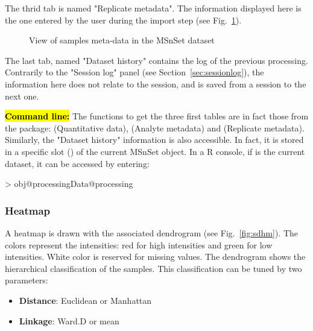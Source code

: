 \documentclass[12pt]{article}
\begin{document}
The thrid tab is named "Replicate metadata". The information displayed here is the one entered by the user during the import step (see Fig.~\ref{fig:sdqv3}).

\begin {figure}
\centering
{}
\caption{View of samples meta-data in the MSnSet dataset}\label{fig:sdqv3}
\end {figure}

The last tab, named "Dataset history" contains the log of the previous processing. Contrarily to the "Session log" panel (see Section~\ref{sec:sessionlog}), the information here does not relate to the session, and is saved from a session to the next one.

\hl{\bf Command line:}  The  functions to get the three first tables are in fact those from the  package:  (Quantitative data),  (Analyte metadata) and  (Replicate metadata). %
Similarly, the "Dataset history" information is also accessible. In fact, it is stored in a specific slot () of the current MSnSet object. In a R console, if  is the current dataset, it can be accessed by entering:
\begin{Schunk}
\begin{Sinput}
> obj@processingData@processing
\end{Sinput}
\end{Schunk}

\subsubsection {Heatmap}
A heatmap is drawn with the associated dendrogram (see Fig.~\ref{fig:sdhm}). The colors represent the intensities: red for high intensities and green for low intensities. White color is reserved for missing values.
The dendrogram shows the hierarchical classification of the samples. This classification can be tuned by two parameters:
\begin {itemize}
  \item \textbf{Distance}: Euclidean or Manhattan
  \item \textbf{Linkage}: Ward.D or mean
\end {itemize}
\end{document}
